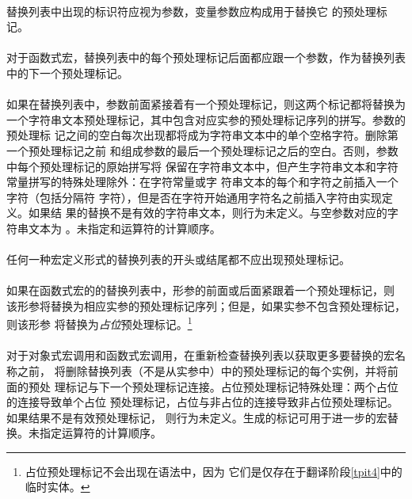 \paragraph{}
替换列表中出现的标识符应视为参数，变量参数应构成用于替换它
的预处理标记。

\constraint
\paragraph{}
对于函数式宏，替换列表中的每个预处理标记\tm{\#}后面都应跟一个参数，作为替换列表
中的下一个预处理标记。

\semantic
\paragraph{}
如果在替换列表中，参数前面紧接着有一个\tm{\#}预处理标记，则这两个标记都将替换为
一个字符串文本预处理标记，其中包含对应实参的预处理标记序列的拼写。参数的预处理标
记之间的空白每次出现都将成为字符串文本中的单个空格字符。删除第一个预处理标记之前
和组成参数的最后一个预处理标记之后的空白。否则，参数中每个预处理标记的原始拼写将
保留在字符串文本中，但产生字符串文本和字符常量拼写的特殊处理除外：在字符常量或字
符串文本的每个\tm{\dq}和\tm{\bs}字符之前插入一个\tm{\bs}字符（包括分隔符\tm{\dq}
字符），但是否在\tm{\bs}字符开始通用字符名之前插入\tm{\bs}字符由实现定义。如果结
果的替换不是有效的字符串文本，则行为未定义。与空参数对应的字符串文本为
\tm{\dq\dq}。未指定\tm{\#}和\tm{\#\#}运算符的计算顺序。

\constraint
\paragraph{}
任何一种宏定义形式的替换列表的开头或结尾都不应出现\tm{\#\#}预处理标记。

\semantic
\paragraph{}
如果在函数式宏的的替换列表中，形参的前面或后面紧跟着一个\tm{\#\#}预处理标记，则
该形参将替换为相应实参的预处理标记序列；但是，如果实参不包含预处理标记，则该形参
将替换为\textit{占位}预处理标记。\footnote{占位预处理标记不会出现在语法中，因为
它们是仅存在于翻译阶段\ref{tpit4}中的临时实体。}

\paragraph{}
对于对象式宏调用和函数式宏调用，在重新检查替换列表以获取更多要替换的宏名称之前，
将删除替换列表（不是从实参中）中的\tm{\#\#}预处理标记的每个实例，并将前面的预处
理标记与下一个预处理标记连接。占位预处理标记特殊处理：两个占位的连接导致单个占位
预处理标记，占位与非占位的连接导致非占位预处理标记。如果结果不是有效预处理标记，
则行为未定义。生成的标记可用于进一步的宏替换。未指定运算符的计算顺序。

